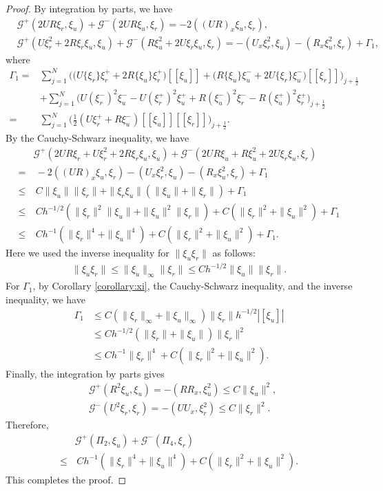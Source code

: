 \documentclass[11pt]{article}
\newcommand{\normb}  [1] {|\![#1]\!|}
\newcommand{\jump}   [1] {[\![#1]\!]}
\newcommand{\Gcal} {\mathcal{G}}
\numberwithin{equation}{section}
\newcommand{\jr}{j+\frac 12}
\begin{document}
\begin{proof}
By integration by parts, we have
\begin{align*}
&\Gcal^+(2UR\xi_r, \xi_u)+\Gcal^-(2UR\xi_u, \xi_r)=-2((UR)_x\xi_u, \xi_r),\\
&\Gcal^+(U\xi_r^2+2R\xi_r\xi_u, \xi_u)+\Gcal^-(R\xi_u^2+2U\xi_r\xi_u, \xi_r)
=-(U_x\xi_r^2, \xi_u)-(R_x\xi_u^2, \xi_r)+\Gamma_1,
\end{align*}
where
\begin{align*}
\Gamma_1=&\sum_{j=1}^{N}\Big(\big(U\{\xi_r\}\xi_r^++2R\{\xi_u\}\xi_r^+\big)\jump{\xi_u}+\big(R\{\xi_u\}\xi_u^-+2U\{\xi_r\}\xi_u^-\big)\jump{\xi_r}\Big)_{\jr}\\
&+\sum_{j=1}^{N}\Big(U(\xi_r^-)^2\xi_u^--U(\xi_r^+)^2\xi_u^++R(\xi_u^-)^2\xi_r^--R(\xi_u^+)^2\xi_r^+\Big)_{\jr}\\
=&\sum_{j=1}^{N}\Big(\frac{1}{2}(U\xi_r^++R\xi_u^-)\jump{\xi_u}\jump{\xi_r}\Big)_{\jr}.
\end{align*}
{By the Cauchy-Schwarz inequality, we have
\begin{align*}
&\Gcal^+(2UR\xi_r+U\xi_r^2+2R\xi_r\xi_u, \xi_u)+\Gcal^-(2UR\xi_u+R\xi_u^2+2U\xi_r\xi_u, \xi_r)\\
=&~ -2((UR)_x\xi_u, \xi_r)-(U_x\xi_r^2, \xi_u)-(R_x\xi_u^2, \xi_r)+\Gamma_1\\
\leq&~C\|\xi_u\|\| \xi_r\|+\|\xi_r\xi_u\|(\|\xi_u\|+\|\xi_r\|)+\Gamma_1\\
\leq&~Ch^{-1/2}(\|\xi_r\|^2\|\xi_u\|+\|\xi_u\|^2\|\xi_r\|)+C(\|\xi_r\|^2+\|\xi_u\|^2)+\Gamma_1\\
\leq&~Ch^{-1}(\|\xi_r\|^4+\|\xi_u\|^4)+C(\|\xi_r\|^2+\|\xi_u\|^2)+\Gamma_1.
\end{align*}
Here we used the inverse inequality for $\|\xi_u\xi_r\|$ as follows:
\begin{align}\label{inv_est:A.1}
\|\xi_u\xi_r\|\leq \|\xi_u\|_{\infty}\|\xi_r\|\leq Ch^{-1/2}\|\xi_u\|\|\xi_r\|.
\end{align}}
For $\Gamma_1$, by Corollary \ref{corollary:xi}, the Cauchy-Schwarz inequality, and the inverse inequality, we have
\begin{align*}
\Gamma_1 &\leq C(\|\xi_r\|_{\infty}+\|\xi_u\|_{\infty})\|\xi_r\|h^{-1/2}\normb{\xi_u}\\
&\leq Ch^{-1/2}(\|\xi_r\|+\|\xi_u\|)\|\xi_r\|^2\\
&\leq Ch^{-1}\|\xi_r\|^{4}+C(\|\xi_r\|^2+\|\xi_u\|^2).
\end{align*}
Finally, the integration by parts gives
\begin{align*}
&\Gcal^+(R^2\xi_u, \xi_u)=-(RR_x,\xi_u^2)\leq C\|\xi_u\|^2,\\
&\Gcal^-(U^2\xi_r, \xi_r)=-(UU_x,\xi_r^2)\leq C\|\xi_r\|^2.
\end{align*}
Therefore,
\begin{align*}
&\Gcal^+(\Pi_2, \xi_u)+\Gcal^-(\Pi_4, \xi_r)\\
\leq&\, Ch^{-1}(\|\xi_r\|^4+\|\xi_u\|^4)+C(\|\xi_r\|^2+\|\xi_u\|^2).
\end{align*}
This completes the proof.
\end{proof}
\end{document}
